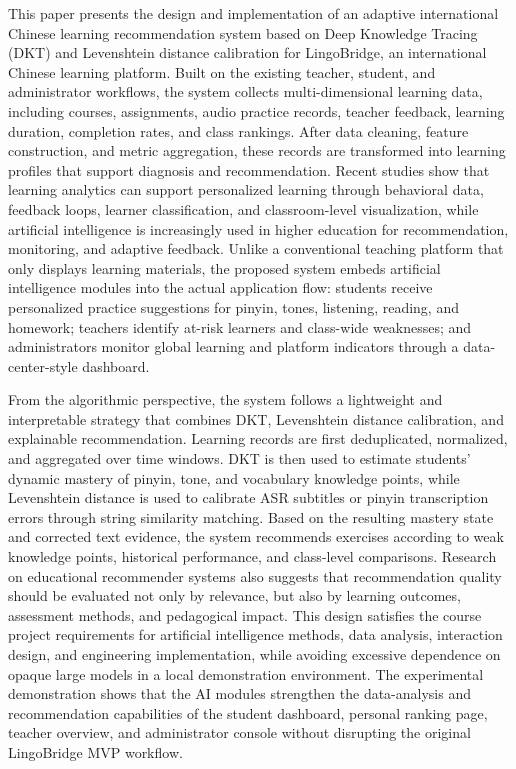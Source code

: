 \begin{abstract*}
This paper presents the design and implementation of an adaptive international Chinese learning recommendation system based on Deep Knowledge Tracing (DKT) and Levenshtein distance calibration for LingoBridge, an international Chinese learning platform. Built on the existing teacher, student, and administrator workflows, the system collects multi-dimensional learning data, including courses, assignments, audio practice records, teacher feedback, learning duration, completion rates, and class rankings. After data cleaning, feature construction, and metric aggregation, these records are transformed into learning profiles that support diagnosis and recommendation. Recent studies show that learning analytics can support personalized learning through behavioral data, feedback loops, learner classification, and classroom-level visualization, while artificial intelligence is increasingly used in higher education for recommendation, monitoring, and adaptive feedback\cite{Ref-LearningAnalyticsPersonalized2024,Ref-AIPersonalizedLearningHE2025}. Unlike a conventional teaching platform that only displays learning materials, the proposed system embeds artificial intelligence modules into the actual application flow: students receive personalized practice suggestions for pinyin, tones, listening, reading, and homework; teachers identify at-risk learners and class-wide weaknesses; and administrators monitor global learning and platform indicators through a data-center-style dashboard.

From the algorithmic perspective, the system follows a lightweight and interpretable strategy that combines DKT, Levenshtein distance calibration, and explainable recommendation. Learning records are first deduplicated, normalized, and aggregated over time windows. DKT is then used to estimate students' dynamic mastery of pinyin, tone, and vocabulary knowledge points, while Levenshtein distance is used to calibrate ASR subtitles or pinyin transcription errors through string similarity matching. Based on the resulting mastery state and corrected text evidence, the system recommends exercises according to weak knowledge points, historical performance, and class-level comparisons. Research on educational recommender systems also suggests that recommendation quality should be evaluated not only by relevance, but also by learning outcomes, assessment methods, and pedagogical impact\cite{Ref-EducationalRecommenderEvaluation2024}. This design satisfies the course project requirements for artificial intelligence methods, data analysis, interaction design, and engineering implementation, while avoiding excessive dependence on opaque large models in a local demonstration environment. The experimental demonstration shows that the AI modules strengthen the data-analysis and recommendation capabilities of the student dashboard, personal ranking page, teacher overview, and administrator console without disrupting the original LingoBridge MVP workflow.
\end{abstract*}
